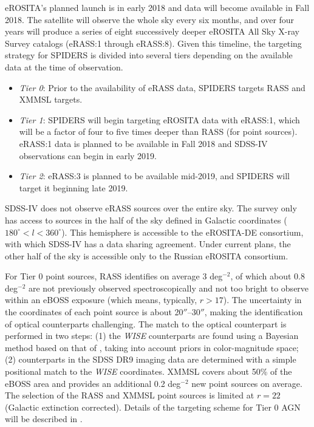 eROSITA's planned launch is in early 2018 and data will become
available in Fall 2018. The satellite will observe the whole sky every
six months, and over four years will produce a series of eight
successively deeper eROSITA All Sky X-ray Survey catalogs (eRASS:1
through eRASS:8). Given this timeline, the targeting strategy for
SPIDERS is divided into several tiers depending on the available data
at the time of observation.
\begin{itemize}
\item {\it Tier 0}: Prior to the availability of eRASS data, SPIDERS 
targets RASS and XMMSL targets. 
\item {\it Tier 1}: SPIDERS will begin targeting eROSITA data with 
eRASS:1, which will be a factor of four to five times deeper than RASS (for
point sources). eRASS:1 data is planned to be available in Fall 2018
and SDSS-IV observations can begin in early 2019.
\item {\it Tier 2}: eRASS:3 is planned to be available mid-2019, and 
SPIDERS will target it beginning late 2019.
\end{itemize}

SDSS-IV does not observe eRASS sources over the entire sky. The survey
only has access to sources in the half of the sky defined in
Galactic coordinates ($180^\circ<l<360^\circ$). This hemisphere is
accessible to the eROSITA-DE consortium, with which SDSS-IV has a data
sharing agreement. Under current plans, the other half of the sky
is accessible only to the Russian eROSITA consortium.

For Tier 0 point sources, RASS identifies on average 3 deg$^{-2}$, of
which about 0.8 deg$^{-2}$ are not previously observed
spectroscopically and not too bright to observe within an eBOSS
exposure (which means, typically, $r>17$).  The uncertainty in the
coordinates of each point source is about 20$''$--30$''$, making the
identification of optical counterparts challenging. The match to the
optical counterpart is performed in two steps: (1) the {\it WISE}
counterparts are found using a Bayesian method based on that
of \citet{budavari09a}, taking into account priors in color-magnitude
space; (2) counterparts in the SDSS DR9 imaging data are determined
with a simple positional match to the {\it WISE} coordinates.  XMMSL covers
about 50\% of the eBOSS area and provides an additional 0.2 deg$^{-2}$
new point sources on average. The selection of the RASS and XMMSL
point sources is limited at $r=22$ (Galactic extinction
corrected). Details of the targeting scheme for Tier 0 AGN will be
described in \citet{dwelly17a}.

